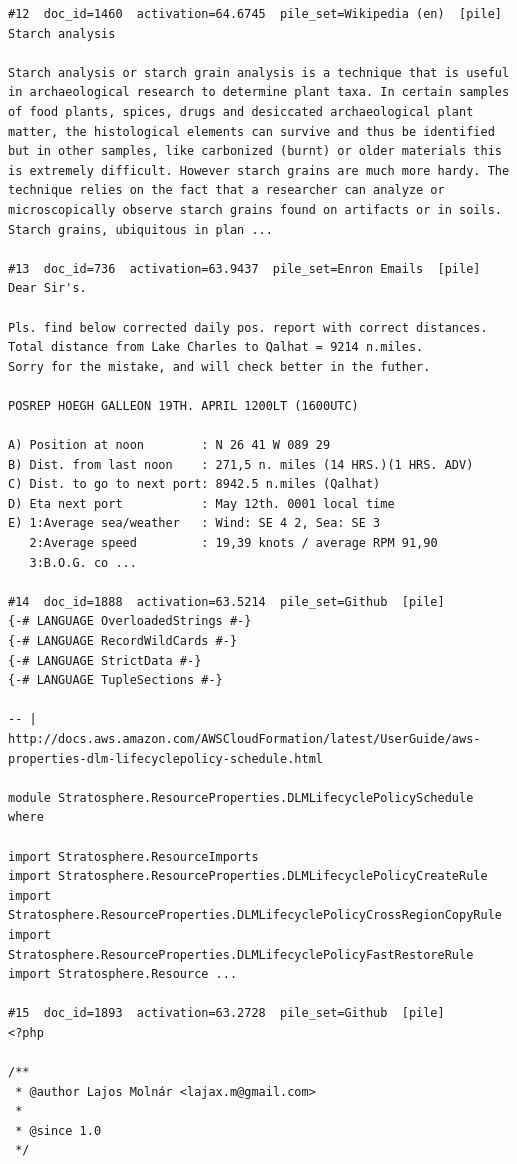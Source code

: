 \begin{verbatim}
#12  doc_id=1460  activation=64.6745  pile_set=Wikipedia (en)  [pile]
Starch analysis

Starch analysis or starch grain analysis is a technique that is useful in archaeological research to determine plant taxa. In certain samples of food plants, spices, drugs and desiccated archaeological plant matter, the histological elements can survive and thus be identified but in other samples, like carbonized (burnt) or older materials this is extremely difficult. However starch grains are much more hardy. The technique relies on the fact that a researcher can analyze or microscopically observe starch grains found on artifacts or in soils. Starch grains, ubiquitous in plan ...

#13  doc_id=736  activation=63.9437  pile_set=Enron Emails  [pile]
Dear Sir's.

Pls. find below corrected daily pos. report with correct distances.
Total distance from Lake Charles to Qalhat = 9214 n.miles.
Sorry for the mistake, and will check better in the futher.

POSREP HOEGH GALLEON 19TH. APRIL 1200LT (1600UTC)

A) Position at noon        : N 26 41 W 089 29
B) Dist. from last noon    : 271,5 n. miles (14 HRS.)(1 HRS. ADV)
C) Dist. to go to next port: 8942.5 n.miles (Qalhat)
D) Eta next port           : May 12th. 0001 local time
E) 1:Average sea/weather   : Wind: SE 4 2, Sea: SE 3
   2:Average speed         : 19,39 knots / average RPM 91,90
   3:B.O.G. co ...

#14  doc_id=1888  activation=63.5214  pile_set=Github  [pile]
{-# LANGUAGE OverloadedStrings #-}
{-# LANGUAGE RecordWildCards #-}
{-# LANGUAGE StrictData #-}
{-# LANGUAGE TupleSections #-}

-- | http://docs.aws.amazon.com/AWSCloudFormation/latest/UserGuide/aws-properties-dlm-lifecyclepolicy-schedule.html

module Stratosphere.ResourceProperties.DLMLifecyclePolicySchedule where

import Stratosphere.ResourceImports
import Stratosphere.ResourceProperties.DLMLifecyclePolicyCreateRule
import Stratosphere.ResourceProperties.DLMLifecyclePolicyCrossRegionCopyRule
import Stratosphere.ResourceProperties.DLMLifecyclePolicyFastRestoreRule
import Stratosphere.Resource ...

#15  doc_id=1893  activation=63.2728  pile_set=Github  [pile]
<?php

/**
 * @author Lajos Molnár <lajax.m@gmail.com>
 *
 * @since 1.0
 */


\end{verbatim}
